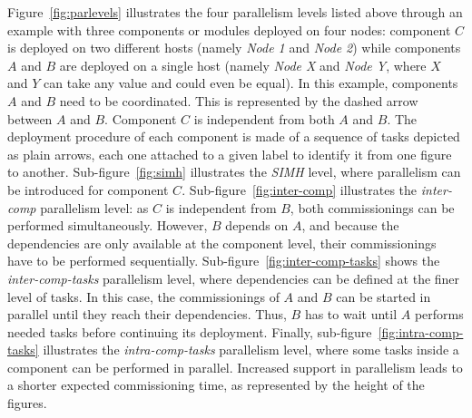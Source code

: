 Figure~\ref{fig:parlevels} illustrates the four parallelism levels
listed above through an example with three components or modules deployed on four nodes:
component $C$ is deployed on two different hosts (namely \emph{Node 1} and \emph{Node 2}) while components $A$ and $B$ are deployed on a single host (namely \emph{Node X} and \emph{Node Y}, where $X$ and $Y$ can take any value and could even be equal). In this example, components $A$ and $B$ need
to be coordinated. This is represented by the dashed arrow between $A$ and $B$. Component $C$ is independent from both $A$ and $B$. The deployment procedure of each component is made of a sequence of tasks depicted as plain arrows, each one attached to a given label to identify it from one figure to another. Sub-figure~\ref{fig:simh} illustrates the \emph{SIMH} level,
where parallelism can be introduced for component
$C$. Sub-figure~\ref{fig:inter-comp} illustrates the \emph{inter-comp}
parallelism level: as $C$ is independent from $B$, both commissionings
can be performed simultaneously. However, $B$ depends on $A$, and
because the dependencies are only available at the component level,
their commissionings have to be performed
sequentially. Sub-figure~\ref{fig:inter-comp-tasks} shows the
\emph{inter-comp-tasks} parallelism level, where dependencies can be
defined at the finer level of tasks. In this case, the commissionings
of $A$ and $B$ can be started in parallel until they reach their
dependencies. Thus, $B$ has to wait until $A$ performs needed tasks
before continuing its deployment. Finally,
sub-figure~\ref{fig:intra-comp-tasks} illustrates the
\emph{intra-comp-tasks} parallelism level, where some tasks inside a
component can be performed in parallel. Increased support in
parallelism leads to a shorter expected commissioning time, as
represented by the height of the figures.


